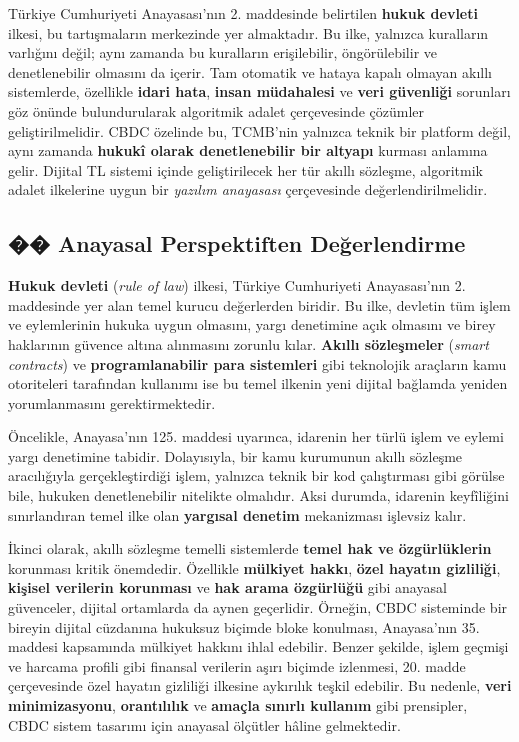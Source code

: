 \documentclass[a4paper,12pt]{article}
\begin{document}
Türkiye Cumhuriyeti Anayasası’nın 2. maddesinde belirtilen \textbf{hukuk devleti} ilkesi, bu tartışmaların merkezinde yer almaktadır. Bu ilke, yalnızca kuralların varlığını değil; aynı zamanda bu kuralların erişilebilir, öngörülebilir ve denetlenebilir olmasını da içerir. Tam otomatik ve hataya kapalı olmayan akıllı sistemlerde, özellikle \textbf{idari hata}, \textbf{insan müdahalesi} ve \textbf{veri güvenliği} sorunları göz önünde bulundurularak algoritmik adalet çerçevesinde çözümler geliştirilmelidir. CBDC özelinde bu, TCMB’nin yalnızca teknik bir platform değil, aynı zamanda \textbf{hukukî olarak denetlenebilir bir altyapı} kurması anlamına gelir. Dijital TL sistemi içinde geliştirilecek her tür akıllı sözleşme, algoritmik adalet ilkelerine uygun bir \textit{yazılım anayasası} çerçevesinde değerlendirilmelidir.


\subsection{�� Anayasal Perspektiften Değerlendirme}

\textbf{Hukuk devleti} (\textit{rule of law}) ilkesi, Türkiye Cumhuriyeti Anayasası’nın 2. maddesinde yer alan temel kurucu değerlerden biridir. Bu ilke, devletin tüm işlem ve eylemlerinin hukuka uygun olmasını, yargı denetimine açık olmasını ve birey haklarının güvence altına alınmasını zorunlu kılar. \textbf{Akıllı sözleşmeler} (\textit{smart contracts}) ve \textbf{programlanabilir para sistemleri} gibi teknolojik araçların kamu otoriteleri tarafından kullanımı ise bu temel ilkenin yeni dijital bağlamda yeniden yorumlanmasını gerektirmektedir.\autocite{akdeniz2021yapay}

Öncelikle, Anayasa'nın 125. maddesi uyarınca, idarenin her türlü işlem ve eylemi yargı denetimine tabidir. Dolayısıyla, bir kamu kurumunun akıllı sözleşme aracılığıyla gerçekleştirdiği işlem, yalnızca teknik bir kod çalıştırması gibi görülse bile, hukuken denetlenebilir nitelikte olmalıdır. Aksi durumda, idarenin keyfîliğini sınırlandıran temel ilke olan \textbf{yargısal denetim} mekanizması işlevsiz kalır.\autocite{kaya2020anayasaya}

İkinci olarak, akıllı sözleşme temelli sistemlerde \textbf{temel hak ve özgürlüklerin} korunması kritik önemdedir. Özellikle \textbf{mülkiyet hakkı}, \textbf{özel hayatın gizliliği}, \textbf{kişisel verilerin korunması} ve \textbf{hak arama özgürlüğü} gibi anayasal güvenceler, dijital ortamlarda da aynen geçerlidir. Örneğin, CBDC sisteminde bir bireyin dijital cüzdanına hukuksuz biçimde bloke konulması, Anayasa'nın 35. maddesi kapsamında mülkiyet hakkını ihlal edebilir. Benzer şekilde, işlem geçmişi ve harcama profili gibi finansal verilerin aşırı biçimde izlenmesi, 20. madde çerçevesinde özel hayatın gizliliği ilkesine aykırılık teşkil edebilir. Bu nedenle, \textbf{veri minimizasyonu}, \textbf{orantılılık} ve \textbf{amaçla sınırlı kullanım} gibi prensipler, CBDC sistem tasarımı için anayasal ölçütler hâline gelmektedir.\autocite{turkel2022gizlilik}
\end{document}

